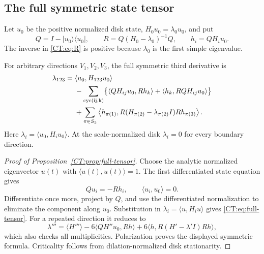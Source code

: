 \subsection{The full symmetric state tensor}

Let $u_0$ be the positive normalized disk state, $H_0u_0=\lambda_0u_0$,
and put
\begin{equation}\label{CT:eq:R}
 Q=I-|u_0\rangle\langle u_0|,
 \qquad R=Q(H_0-\lambda_0)^{-1}Q,
 \qquad h_i=QH_iu_0.
\end{equation}
The inverse in \eqref{CT:eq:R} is positive because $\lambda_0$ is the first
simple eigenvalue.

\begin{proposition}
\label{CT:prop:full-tensor}
For arbitrary directions $V_1,V_2,V_3$, the full symmetric third
derivative is
\begin{align}
 \lambda_{123}={}&\langle u_0,H_{123}u_0\rangle\label{CT:eq:full-tensor}\\
 &-\sum_{\rm cyc(ij,k)}
 \bigl\{\langle QH_{ij}u_0,Rh_k\rangle
          +\langle h_k,RQH_{ij}u_0\rangle\bigr\}\notag\\
 &+\sum_{\pi\in S_3}
 \left\langle h_{\pi(1)},
 R(H_{\pi(2)}-\lambda_{\pi(2)}I)R
 h_{\pi(3)}\right\rangle.\notag
\end{align}
Here $\lambda_i=\langle u_0,H_iu_0\rangle$.  At the scale-normalized disk
$\lambda_i=0$ for every boundary direction.
\end{proposition}

\begin{proof}[Proof of Proposition~\ref{CT:prop:full-tensor}]
Choose the analytic normalized eigenvector $u(t)$ with
$\langle u(t),u(t)\rangle=1$.  The first differentiated state equation
gives
\begin{equation}\label{CT:eq:first-state}
 Qu_i=-Rh_i,
 \qquad \langle u_i,u_0\rangle=0.
\end{equation}
Differentiate once more, project by $Q$, and use the differentiated
normalization to eliminate the component along $u_0$.  Substitution in
$\lambda_i=\langle u,H_iu\rangle$ gives \eqref{CT:eq:full-tensor}.
For a repeated direction it reduces to
\[
 \lambda'''=\langle H'''\rangle
 -6\langle QH''u_0,Rh\rangle
 +6\langle h,R(H'-\lambda'I)Rh\rangle,
\]
which also checks all multiplicities.  Polarization proves the displayed
symmetric formula.  Criticality follows from dilation-normalized disk
stationarity.
\end{proof}

